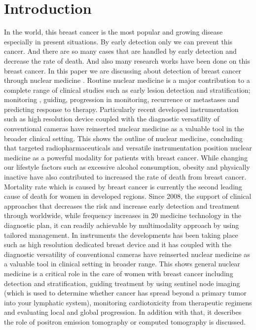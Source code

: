 \documentclass{article}
\begin{document}
\section{Introduction}
In the world, this breast cancer is the most popular and growing disease especially in 
present situations. By early detection only we can prevent this cancer. And there are so 
many cases that are handled by early detection and decrease the rate of death. And also 
many research works have been done on this breast cancer. In this paper we are discussing 
about detection of breast cancer through nuclear medicine . Routine nuclear medicine is a 
major contribution to a complete range of clinical studies such as early lesion detection and 
stratification; monitoring , guiding, progression in monitoring, recurrence or metastases and 
predicting response to therapy. Particularly recent developed instrumentation such as highresolution device coupled with the diagnostic versatility of conventional cameras have 
reinserted nuclear medicine as a valuable tool in the broader clinical setting. This shows the 
outline of nuclear medicine, concluding that targeted radiopharmaceuticals and versatile 
instrumentation position nuclear medicine as a powerful modality for patients with breast 
cancer.
While changing our lifestyle factors such as excessive alcohol consumption, obesity and 
physically inactive have also contributed to increased the rate of death from breast cancer. 
Mortality rate which is caused by breast cancer is currently the second leading cause of 
death for women in developed regions. Since 2008, the support of clinical approaches that 
decreases the risk and increase early detection and treatment through worldwide, while 
frequency increases in 20%
medicine technology in the diagnostic plan, it can readily achievable by multimodality 
approach by using tailored management. In instruments the developments has been taking 
place such as high resolution dedicated breast device and it has coupled with the diagnostic 
versatility of conventional cameras have reinserted nuclear medicine as a valuable tool in 
clinical setting in broader range. This shows general nuclear medicine is a critical role in the 
care of women with breast cancer including detection and stratification, guiding treatment
by using sentinel node imaging (which is used to determine whether cancer has spread 
beyond a primary tumor into your lymphatic system), monitoring cardiotoxicity from 
therapeutic regimens and evaluating local and global progression. In addition with that, it 
describes the role of positron emission tomography or computed tomography is discussed.
\end{document}
